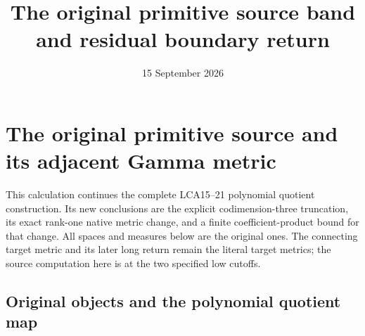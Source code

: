 \documentclass[10pt]{article}
\title{The original primitive source band and residual boundary return}
\author{}
\date{15 September 2026}
\begin{document}
\maketitle

\section{The original primitive source and its adjacent Gamma metric}
\label{sec:PDS}

This calculation continues the complete LCA15--21 polynomial quotient
construction. Its new conclusions are the explicit codimension-three
truncation, its exact rank-one native metric change, and a finite
coefficient-product bound for that change. All spaces and measures below
are the original ones. The connecting target metric and its later
long return remain the literal target metrics; the source computation
here is at the two specified low cutoffs.

\subsection{Original objects and the polynomial quotient map}
\end{document}
